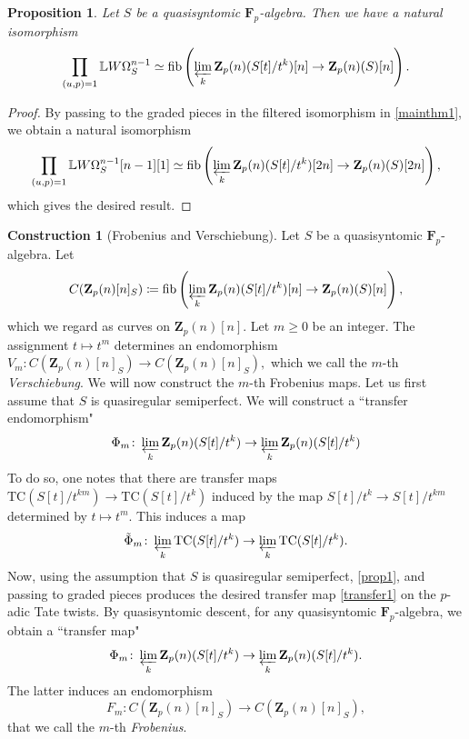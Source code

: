 \documentclass[10pt,letterpaper]{amsart}
\numberwithin{figure}{section}
\numberwithin{equation}{section}
\newtheorem{proposition}[figure]{Proposition}
\theoremstyle{definition}
\theoremstyle{definition}
\theoremstyle{definition}
\theoremstyle{definition}
\newtheorem{construction}[figure]{Construction}
\newcommand{\TC}{\mathrm{TC}}
\renewcommand{\L}{\mathbb{L}}
\newcommand{\Z}{\mathbf{Z}}
\newcommand{\F}{\mathbf{F}}
\begin{document}
\begin{proposition}\label{prop98}
Let $S$ be a quasisyntomic $\F_p$-algebra. Then we have a natural isomorphism
$$\prod_{(u,p)=1}\L W\Omega^{n-1}_S \simeq \mathrm{fib} \left(\varprojlim_k \Z_p(n)(S[t]/t^k)[n] \to \Z_p(n)(S)[n]\right).$$
\end{proposition}
    

    \begin{proof}
        By passing to the graded pieces in the filtered isomorphism in \cref{mainthm1}, we obtain a natural isomorphism $$\prod_{(u,p)=1}\L W\Omega^{n-1}_S[n-1][1] \simeq \mathrm{fib} \left(\varprojlim_k \Z_p(n)(S[t]/t^k)[2n] \to \Z_p(n)(S)[2n]\right),$$ which gives the desired result.\end{proof}{}



\begin{construction}[Frobenius and Verschiebung]\label{constrans}
Let $S$ be a quasisyntomic $\mathbf F_p$-algebra. Let $$C (\mathbf{Z}_p(n)[n]_S) \coloneqq \mathrm{fib} \left(\varprojlim_k \Z_p(n)(S[t]/t^k)[n] \to \Z_p(n)(S)[n]\right),$$ which we regard as curves on $\mathbf Z_p(n)[n].$ Let $m \ge 0$ be an integer. The assignment $t \mapsto t^m$ determines an endomorphism  $V_m\colon C (\mathbf{Z}_p(n)[n]_S) \to C (\mathbf{Z}_p(n)[n]_S),$ which we call the $m$-th \emph{Verschiebung}. We will now construct the $m$-th Frobenius maps. Let us first assume that $S$ is quasiregular semiperfect. We will construct a ``transfer endomorphism" \begin{equation}\label{transfer1}
    \Phi_m\colon \varprojlim_k \Z_p(n)(S[t]/t^k)  \to \varprojlim_k \Z_p(n)(S[t]/t^k)
\end{equation}{}To do so, one notes that there are transfer maps $ \TC (S[t]/t^{km}) \to \TC (S[t]/t^k)$ induced by the map $S[t]/t^{k} \to S[t]/t^{km}$ determined by $t \mapsto t^m.$ This induces a map $$\Tilde{\Phi}_m\colon \varprojlim_k \TC(S[t]/t^k) \to \varprojlim_k \TC(S[t]/t^k).$$ Now, using the assumption that $S$ is quasiregular semiperfect, \cref{prop1}, and passing to graded pieces produces the desired transfer map \cref{transfer1} on the $p$-adic Tate twists. By quasisyntomic descent, for any quasisyntomic $\mathbf F_p$-algebra, we obtain a ``transfer map" \begin{equation}\label{transfer}
    \Phi_m\colon \varprojlim_k \Z_p(n)(S[t]/t^k)  \to \varprojlim_k \Z_p(n)(S[t]/t^k).
\end{equation} The latter induces an endomorphism $$F_m \colon C (\mathbf{Z}_p(n)[n]_S) \to C (\mathbf{Z}_p(n)[n]_S),$$ that we call the $m$-th \emph{Frobenius}.
\end{construction}
\end{document}
